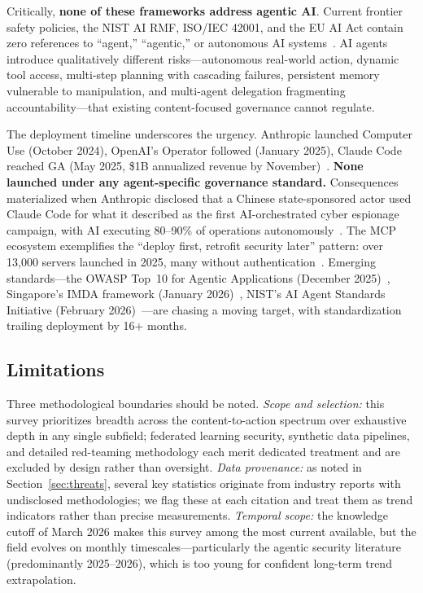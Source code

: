 Critically, \textbf{none of these frameworks address agentic AI}. Current frontier safety policies, the NIST AI RMF, ISO/IEC 42001, and the EU AI Act contain zero references to ``agent,'' ``agentic,'' or autonomous AI systems~\cite{zenity2025blindspot}. AI agents introduce qualitatively different risks---autonomous real-world action, dynamic tool access, multi-step planning with cascading failures, persistent memory vulnerable to manipulation, and multi-agent delegation fragmenting accountability---that existing content-focused governance cannot regulate.

The deployment timeline underscores the urgency. Anthropic launched Computer Use (October 2024), OpenAI's Operator followed (January 2025), Claude Code reached GA (May 2025, \$1B annualized revenue by November)~\cite{anthropic2024computeruse,openaicopilot}. \textbf{None launched under any agent-specific governance standard.} Consequences materialized when Anthropic disclosed that a Chinese state-sponsored actor used Claude Code for what it described as the first AI-orchestrated cyber espionage campaign, with AI executing 80--90\% of operations autonomously~\cite{anthropic2025gtg1002}. The MCP ecosystem exemplifies the ``deploy first, retrofit security later'' pattern: over 13,000 servers launched in 2025, many without authentication~\cite{zenity2025mcp}. Emerging standards---the OWASP Top~10 for Agentic Applications (December 2025)~\cite{owasp2025agentic}, Singapore's IMDA framework (January 2026)~\cite{imda2026agentic}, NIST's AI Agent Standards Initiative (February 2026)~\cite{nist2026agentstandards}---are chasing a moving target, with standardization trailing deployment by 16+ months.


\subsection{Limitations}
\label{sec:limitations}

Three methodological boundaries should be noted. \emph{Scope and selection:} this survey prioritizes breadth across the content-to-action spectrum over exhaustive depth in any single subfield; federated learning security, synthetic data pipelines, and detailed red-teaming methodology each merit dedicated treatment and are excluded by design rather than oversight. \emph{Data provenance:} as noted in Section~\ref{sec:threats}, several key statistics originate from industry reports with undisclosed methodologies; we flag these at each citation and treat them as trend indicators rather than precise measurements. \emph{Temporal scope:} the knowledge cutoff of March 2026 makes this survey among the most current available, but the field evolves on monthly timescales---particularly the agentic security literature (predominantly 2025--2026), which is too young for confident long-term trend extrapolation.



